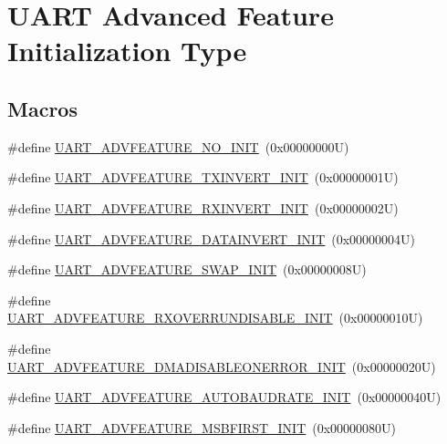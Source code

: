 \hypertarget{group___u_a_r_t___advanced___features___initialization___type}{}\section{U\+A\+RT Advanced Feature Initialization Type}
\label{group___u_a_r_t___advanced___features___initialization___type}
\subsection*{Macros}
\begin{DoxyCompactItemize}
\item 
\#define \hyperlink{group___u_a_r_t___advanced___features___initialization___type_gab696b28f33174d038e0bfd300c1b2a77}{U\+A\+R\+T\+\_\+\+A\+D\+V\+F\+E\+A\+T\+U\+R\+E\+\_\+\+N\+O\+\_\+\+I\+N\+IT}~(0x00000000\+U)
\item 
\#define \hyperlink{group___u_a_r_t___advanced___features___initialization___type_ga17c49d1895d43bfd6e0cf993103731ae}{U\+A\+R\+T\+\_\+\+A\+D\+V\+F\+E\+A\+T\+U\+R\+E\+\_\+\+T\+X\+I\+N\+V\+E\+R\+T\+\_\+\+I\+N\+IT}~(0x00000001\+U)
\item 
\#define \hyperlink{group___u_a_r_t___advanced___features___initialization___type_gad5a4923f3e771d276c6a5332e3945e2a}{U\+A\+R\+T\+\_\+\+A\+D\+V\+F\+E\+A\+T\+U\+R\+E\+\_\+\+R\+X\+I\+N\+V\+E\+R\+T\+\_\+\+I\+N\+IT}~(0x00000002\+U)
\item 
\#define \hyperlink{group___u_a_r_t___advanced___features___initialization___type_ga3066937ab29631f78820865605e83628}{U\+A\+R\+T\+\_\+\+A\+D\+V\+F\+E\+A\+T\+U\+R\+E\+\_\+\+D\+A\+T\+A\+I\+N\+V\+E\+R\+T\+\_\+\+I\+N\+IT}~(0x00000004\+U)
\item 
\#define \hyperlink{group___u_a_r_t___advanced___features___initialization___type_ga56b48c24063e0f04b09f592c3ce7d2ac}{U\+A\+R\+T\+\_\+\+A\+D\+V\+F\+E\+A\+T\+U\+R\+E\+\_\+\+S\+W\+A\+P\+\_\+\+I\+N\+IT}~(0x00000008\+U)
\item 
\#define \hyperlink{group___u_a_r_t___advanced___features___initialization___type_ga053355b64de3105a19f3e5560f3557e4}{U\+A\+R\+T\+\_\+\+A\+D\+V\+F\+E\+A\+T\+U\+R\+E\+\_\+\+R\+X\+O\+V\+E\+R\+R\+U\+N\+D\+I\+S\+A\+B\+L\+E\+\_\+\+I\+N\+IT}~(0x00000010\+U)
\item 
\#define \hyperlink{group___u_a_r_t___advanced___features___initialization___type_gafd2fb1991911b82d75556eafe228ef90}{U\+A\+R\+T\+\_\+\+A\+D\+V\+F\+E\+A\+T\+U\+R\+E\+\_\+\+D\+M\+A\+D\+I\+S\+A\+B\+L\+E\+O\+N\+E\+R\+R\+O\+R\+\_\+\+I\+N\+IT}~(0x00000020\+U)
\item 
\#define \hyperlink{group___u_a_r_t___advanced___features___initialization___type_ga09fdbb71292c899d6dc89a41e5752564}{U\+A\+R\+T\+\_\+\+A\+D\+V\+F\+E\+A\+T\+U\+R\+E\+\_\+\+A\+U\+T\+O\+B\+A\+U\+D\+R\+A\+T\+E\+\_\+\+I\+N\+IT}~(0x00000040\+U)
\item 
\#define \hyperlink{group___u_a_r_t___advanced___features___initialization___type_ga911654f44cd040f41871ec5af5ec1343}{U\+A\+R\+T\+\_\+\+A\+D\+V\+F\+E\+A\+T\+U\+R\+E\+\_\+\+M\+S\+B\+F\+I\+R\+S\+T\+\_\+\+I\+N\+IT}~(0x00000080\+U)
\end{DoxyCompactItemize}


